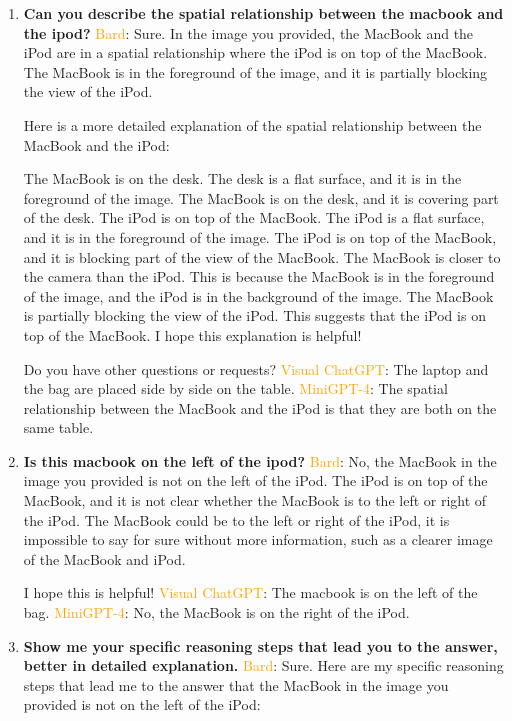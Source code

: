\begin{enumerate}
    \item \textbf{Can you describe the spatial relationship between the macbook and the ipod?}
    \subitem \textcolor{orange}{Bard}: 
    Sure. In the image you provided, the MacBook and the iPod are in a spatial relationship where the iPod is on top of the MacBook. The MacBook is in the foreground of the image, and it is partially blocking the view of the iPod.
    
    Here is a more detailed explanation of the spatial relationship between the MacBook and the iPod:
    
    The MacBook is on the desk. The desk is a flat surface, and it is in the foreground of the image. The MacBook is on the desk, and it is covering part of the desk.
    The iPod is on top of the MacBook. The iPod is a flat surface, and it is in the foreground of the image. The iPod is on top of the MacBook, and it is blocking part of the view of the MacBook.
    The MacBook is closer to the camera than the iPod. This is because the MacBook is in the foreground of the image, and the iPod is in the background of the image.
    The MacBook is partially blocking the view of the iPod. This suggests that the iPod is on top of the MacBook.
    I hope this explanation is helpful!
    
    Do you have other questions or requests?
    \subitem \textcolor{orange}{Visual ChatGPT}: The laptop and the bag are placed side by side on the table.
    \subitem \textcolor{orange}{MiniGPT-4}: The spatial relationship between the MacBook and the iPod is that they are both on the same table.
    \item \textbf{Is this macbook on the left of the ipod?}
    \subitem \textcolor{orange}{Bard}: 
    No, the MacBook in the image you provided is not on the left of the iPod. The iPod is on top of the MacBook, and it is not clear whether the MacBook is to the left or right of the iPod. The MacBook could be to the left or right of the iPod, it is impossible to say for sure without more information, such as a clearer image of the MacBook and iPod.

    I hope this is helpful!
    \subitem \textcolor{orange}{Visual ChatGPT}: The macbook is on the left of the bag.
    \subitem \textcolor{orange}{MiniGPT-4}: No, the MacBook is on the right of the iPod.
    \item \textbf{Show me your specific reasoning steps that lead you to the answer, better in detailed explanation.}
    \subitem \textcolor{orange}{Bard}: 
    Sure. Here are my specific reasoning steps that lead me to the answer that the MacBook in the image you provided is not on the left of the iPod:
    

\end{enumerate}
